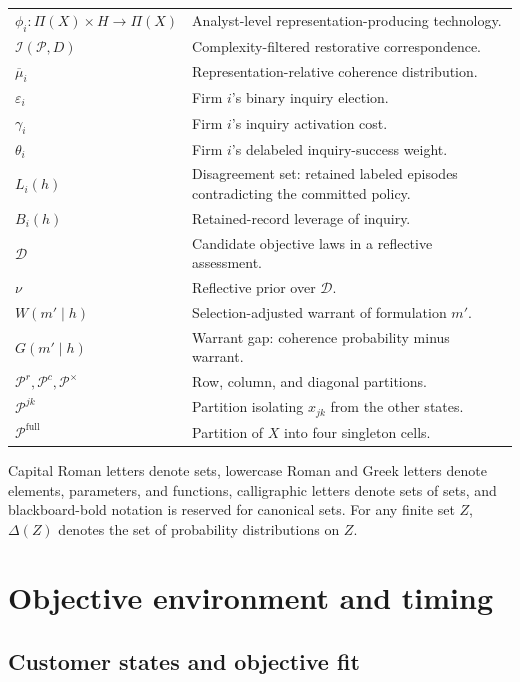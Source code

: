 \documentclass[11pt]{article}
\newcommand{\Prow}{\mathcal P^{r}}
\newcommand{\Pcol}{\mathcal P^{c}}
\newcommand{\Pdiag}{\mathcal P^{\times}}
\newcommand{\Pfull}{\mathcal P^{\mathrm{full}}}
\begin{document}
\begin{center}
\begin{tabularx}{\textwidth}{@{}>{\raggedright\arraybackslash}p{}X@{}}
$\phi_i:\Pi(X)\times H\to\Pi(X)$ & Analyst-level representation-producing technology. \\
$\mathcal I(\mathcal P,D)$ & Complexity-filtered restorative correspondence. \\
$\overline\mu_i$ & Representation-relative coherence distribution. \\
$\varepsilon_i$ & Firm $i$'s binary inquiry election. \\
$\gamma_i$ & Firm $i$'s inquiry activation cost. \\
$\theta_i$ & Firm $i$'s delabeled inquiry-success weight. \\
$L_i(h)$ & Disagreement set: retained labeled episodes contradicting the committed policy. \\
$B_i(h)$ & Retained-record leverage of inquiry. \\
$\mathcal D$ & Candidate objective laws in a reflective assessment. \\
$\nu$ & Reflective prior over $\mathcal D$. \\
$W(m'\mid h)$ & Selection-adjusted warrant of formulation $m'$. \\
$G(m'\mid h)$ & Warrant gap: coherence probability minus warrant. \\
$\Prow,\Pcol,\Pdiag$ & Row, column, and diagonal partitions. \\
$\mathcal P^{jk}$ & Partition isolating $x_{jk}$ from the other states. \\
$\Pfull$ & Partition of $X$ into four singleton cells. \\
\bottomrule
\end{tabularx}
\end{center}

Capital Roman letters denote sets, lowercase Roman and Greek letters denote
elements, parameters, and functions, calligraphic letters denote sets of sets,
and blackboard-bold notation is reserved for canonical sets.  For any finite
set $Z$, $\Delta(Z)$ denotes the set of probability distributions on $Z$.

\section{Objective environment and timing}

\subsection{Customer states and objective fit}
\end{document}

